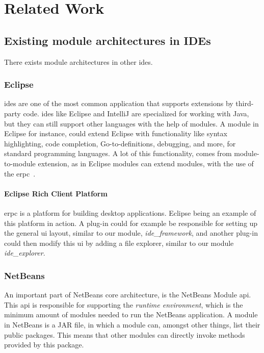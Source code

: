 \chapter{Related Work} \label{cha:related}

\section{Existing module architectures in IDEs}

There exists module architectures in other \gls*{ide}s.


\subsection{Eclipse}

\gls*{ide}s are one of the most common application that supports extensions by
third-party code. \gls*{ide}s like Eclipse and IntelliJ are specialized for
working with Java, but they can still support other languages with the help of
modules. A module in Eclipse for instance, could extend Eclipse with
functionality like syntax highlighting, code completion, Go-to-definitions,
debugging, and more, for standard programming languages. A lot of this
functionality, comes from module-to-module extension, as in Eclipse modules can
extend modules, with the use of the \gls*{erpc}~\cite{eclipseRcp}.

\subsubsection{Eclipse Rich Client Platform}
\gls*{erpc} is a platform for building desktop applications. Eclipse being an
example of this platform in action. A plug-in could for example be responsible
for setting up the general \gls*{ui} layout, similar to our module,
\textit{ide\_framework}, and another plug-in could then modify this \gls*{ui} by
adding a file explorer, similar to our module \textit{ide\_explorer}.


\subsection{NetBeans}

An important part of NetBeans core architecture, is the NetBeans Module
\gls*{api}. This \gls{api} is responsible for supporting the
\textit{runtime environment}, which is the minimum amount of modules needed to
run the NetBeans application. A module in NetBeans is a JAR file, in which a
module can, amongst other things, list their public packages. This means that
other modules can directly invoke methods provided by this package.


